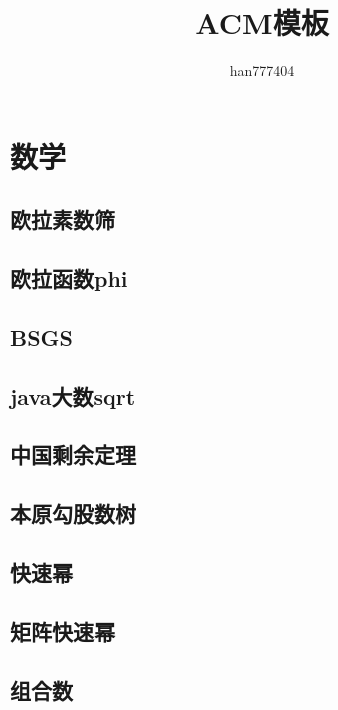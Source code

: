 \documentclass[twocolumn,a4,twoside]{book}
\title{\CJKfamily{hei} {\bfseries ACM模板}}
\author{han777404}
\begin{document}
\small
	\pagestyle{empty}
	\begin{titlepage}
		\maketitle
	\end{titlepage}
	\tableofcontents
	\mainmatter
	\pagestyle{fancy}
	
	
	\chapter{数学}
		\section{欧拉素数筛}
		
		\section{欧拉函数phi}
		
		\section{BSGS}
		
		\section{java大数sqrt}
		
		\section{中国剩余定理}
		
		\section{本原勾股数树}
		
		\section{快速幂}
		
		\section{矩阵快速幂}
		
		\section{组合数}
		
	
\end{document}
